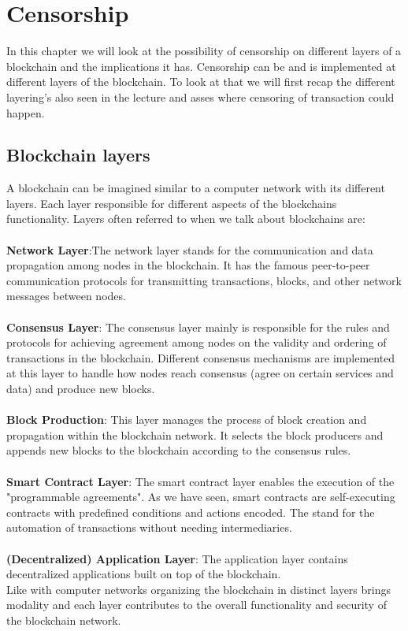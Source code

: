 \documentclass{article}
\begin{document}
\section{Censorship}

In this chapter we will look at the possibility of censorship on different layers of a blockchain and the implications it has. Censorship can be and is implemented at different layers of the blockchain. To look at that we will first recap the different layering's also seen in the lecture and asses where censoring of transaction could happen.

\subsection{Blockchain layers}
A blockchain can be imagined similar to a computer network with its different layers. Each layer responsible for different aspects of the blockchains functionality. Layers often referred to when we talk about blockchains are:\\
\\
\textbf{Network Layer}:The network layer stands for the communication and data propagation among nodes in the blockchain. It has the famous peer-to-peer communication protocols for transmitting transactions, blocks, and other network messages between nodes.\\
\\
\textbf{Consensus Layer}: The consensus layer mainly is responsible for the rules and protocols for achieving agreement among nodes on the validity and ordering of transactions in the blockchain. Different consensus mechanisms are implemented at this layer to handle how nodes reach consensus (agree on certain services and data) and produce new blocks.\\
\\
\textbf{Block Production}: This layer manages the process of block creation and propagation within the blockchain network. It selects the block producers and appends new blocks to the blockchain according to the consensus rules.\\\\
\textbf{Smart Contract Layer}: The smart contract layer enables the execution of the "programmable agreements". As we have seen, smart contracts are self-executing contracts with predefined conditions and actions encoded. The stand for the automation of transactions without needing intermediaries.\\
\\
\textbf{(Decentralized) Application Layer}: The application layer contains decentralized applications built on top of the blockchain.
\\
Like with computer networks organizing the blockchain in distinct layers brings modality and each layer contributes to the overall functionality and security of the blockchain network.
\end{document}
